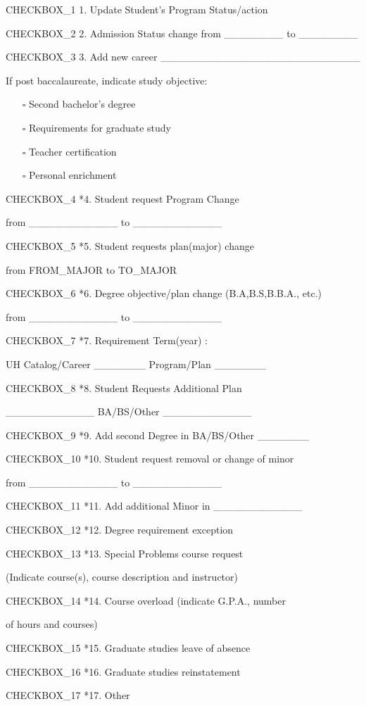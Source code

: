 \documentclass[11pt,letterpaper]{article}
\begin{document}
\noindent
\begin{minipage}{0.48\textwidth}
\small
{{CHECKBOX_1}} 1. Update Student's Program Status/action

{{CHECKBOX_2}} 2. Admission Status change from \_\_\_\_\_\_\_\_ to \_\_\_\_\_\_\_\_

{{CHECKBOX_3}} 3. Add new career \_\_\_\_\_\_\_\_\_\_\_\_\_\_\_\_\_\_\_\_\_\_\_\_\_\_\_

\quad If post baccalaureate, indicate study objective:
\begin{itemize}
\item[$\square$] Second bachelor's degree
\item[$\square$] Requirements for graduate study
\item[$\square$] Teacher certification
\item[$\square$] Personal enrichment
\end{itemize}

{{CHECKBOX_4}} *4. Student request Program Change

\quad from \_\_\_\_\_\_\_\_\_\_\_\_ to \_\_\_\_\_\_\_\_\_\_\_\_

{{CHECKBOX_5}} *5. Student requests plan(major) change

\quad from {{FROM_MAJOR}} to {{TO_MAJOR}}

{{CHECKBOX_6}} *6. Degree objective/plan change (B.A,B.S,B.B.A., etc.)

\quad from \_\_\_\_\_\_\_\_\_\_\_\_ to \_\_\_\_\_\_\_\_\_\_\_\_

{{CHECKBOX_7}} *7. Requirement Term(year) :

\quad UH Catalog/Career \_\_\_\_\_\_\_ Program/Plan \_\_\_\_\_\_\_

{{CHECKBOX_8}} *8. Student Requests Additional Plan

\quad \_\_\_\_\_\_\_\_\_\_\_\_ BA/BS/Other \_\_\_\_\_\_\_\_\_\_\_\_

\end{minipage}
\hfill
\begin{minipage}{0.48\textwidth}
\small
{{CHECKBOX_9}} *9. Add second Degree in BA/BS/Other \_\_\_\_\_\_\_

{{CHECKBOX_10}} *10. Student request removal or change of minor

\quad from \_\_\_\_\_\_\_\_\_\_\_\_ to \_\_\_\_\_\_\_\_\_\_\_\_

{{CHECKBOX_11}} *11. Add additional Minor in \_\_\_\_\_\_\_\_\_\_\_\_

{{CHECKBOX_12}} *12. Degree requirement exception

{{CHECKBOX_13}} *13. Special Problems course request

\quad (Indicate course(s), course description and instructor)

{{CHECKBOX_14}} *14. Course overload (indicate G.P.A., number

\quad of hours and courses)

{{CHECKBOX_15}} *15. Graduate studies leave of absence

{{CHECKBOX_16}} *16. Graduate studies reinstatement

{{CHECKBOX_17}} *17. Other
\end{minipage}
\end{document}
